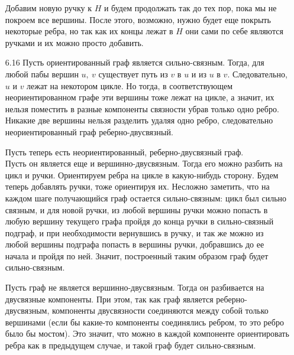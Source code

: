 \documentclass[10pt]{article}
\begin{document}
\begin{enumerate}
Добавим новую ручку к $H$ и будем продолжать так до тех пор, пока мы не покроем все вершины. После этого, возможно, нужно будет еще покрыть некоторые ребра, но так как их концы лежат в $H$ они сами по себе являются ручками и их можно просто добавить.

\item[6.16] Пусть ориентированный граф является сильно-связным. Тогда, для любой пабы вершин $u,\ v$ существует путь из $v$ в $u$ и из $u$ в $v$. Следовательно, $u$ и $v$ лежат на некотором цикле. Но тогда, в соответствующем неориентированном графе эти вершины тоже лежат на цикле, а значит, их нельзя поместить в разные компоненты связности убрав только одно ребро. Никакие две вершины нельзя разделить удаляя одно ребро, следовательно неориентированный граф реберно-двусвязный.

Пусть теперь есть неориентированный, реберно-двусвязный граф. \\
Пусть он является еще и вершинно-двусвязным. Тогда его можно разбить на цикл и ручки. Ориентируем ребра на цикле в какую-нибудь сторону. Будем теперь добавлять ручки, тоже ориентируя их. Несложно заметить, что на каждом шаге получающийся граф остается сильно-связным: цикл был сильно связным, и для новой ручки, из любой вершины ручки можно попасть в любую вершину текущего графа пройдя до конца ручки в сильно-связный подграф, и при необходимости вернувшись в ручку, и так же можно из любой вершины подграфа попасть в вершины ручки, добравшись до ее начала и пройдя по ней. Значит, построенный таким образом граф будет сильно-связным.

Пусть граф не является вершинно-двусвязным. Тогда он разбивается на двусвязные компоненты. При этом, так как граф является реберно-двусвязным, компоненты двусвязности соединяются между собой только вершинами (если бы какие-то компоненты соединялись ребром, то это ребро было бы мостом). Это значит, что можно в каждой компоненте ориентировать ребра как в предыдущем случае, и такой граф будет сильно-связным.
\end{enumerate}
\end{document}

